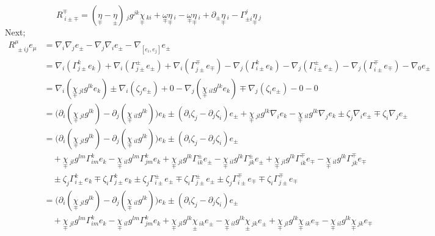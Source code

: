 \documentclass[a4paper,11pt]{article}
\numberwithin{equation}{section}
\theoremstyle{definition}
\begin{document}
\begin{equation}
    \boxed{R^\mp_{\;i\pm\mp} =
    (\underset{\mp}{\eta}-\underset{\pm}{\eta})\,_jg^{jk}\underset{\mp}{\chi}\,_{ki}
    +  \underset{\mp}{\omega} \underset{\mp}{\eta}\,_i
    -\underset{\mp}{\omega}\underset{\mp}{\eta}\,_i
    +\partial_\pm\underset{\mp}{\eta}\,_i  -\Gamma_{\pm i}^j\underset{\mp}{\eta}\,_j}
\end{equation}
Next;
\begin{align*}
    R^\mu_{\;\pm ij} e_\mu &= \nabla_i \nabla_j e_\pm - \nabla_j \nabla_i e_\pm - \nabla_{[e_i,e_j]} e_\pm\\
    &= \nabla_i (\Gamma_{j\pm}^k e_k) + \nabla_i (\Gamma_{j\pm}^\pm e_\pm) + \nabla_i (\Gamma_{j\pm}^\mp e_\mp) - \nabla_j(\Gamma_{i\pm}^k e_k) - \nabla_j(\Gamma_{i\pm}^\pm e_\pm) - \nabla_j(\Gamma_{i\pm}^\mp e_\mp) - \nabla_0 e_\pm\\
    &= \nabla_i (\underset{\mp}{\chi}\,_{jl}g^{lk} e_k) \pm \nabla_i (\zeta_j e_\pm) + 0 - \nabla_j(\underset{\mp}{\chi}\,_{il}g^{lk} e_k) \mp \nabla_j(\zeta_i e_\pm) - 0 - 0\\
    &= \Big(\partial_i (\underset{\mp}{\chi}\,_{jl}g^{lk}) - \partial_j(\underset{\mp}{\chi}\,_{il}g^{lk}) \Big)e_k \pm (\partial_i \zeta_j - \partial_j\zeta_i )e_\pm
    + \underset{\mp}{\chi}\,_{jl} g^{lk} \nabla_i e_k
    - \underset{\mp}{\chi}\,_{il} g^{lk} \nabla_j e_k
    \pm \zeta_j\nabla_i e_\pm
    \mp \zeta_i\nabla_j e_\pm\\
    &= \Big(\partial_i (\underset{\mp}{\chi}\,_{jl}g^{lk}) - \partial_j(\underset{\mp}{\chi}\,_{il}g^{lk}) \Big)e_k \pm (\partial_i \zeta_j - \partial_j\zeta_i )e_\pm\\
    &\quad + \underset{\mp}{\chi}\,_{jl}g^{lm} \Gamma_{im}^k e_k - \underset{\mp}{\chi}\,_{il}g^{lm}\Gamma_{jm}^k e_k + \underset{\mp}{\chi}\,_{jl}g^{lk} \Gamma_{ik}^\pm e_\pm - \underset{\mp}{\chi}\,_{il}g^{lk}\Gamma_{jk}^\pm e_\pm + \underset{\mp}{\chi}\,_{jl}g^{lk} \Gamma_{ik}^\mp e_\mp - \underset{\mp}{\chi}\,_{il}g^{lk}\Gamma_{jk}^\mp e_\mp\\
    &\quad \pm \zeta_j\Gamma_{i\pm}^k e_k
    \mp \zeta_i\Gamma_{j\pm}^k e_k \pm \zeta_j\Gamma_{i\pm}^\pm e_\pm \mp \zeta_i\Gamma_{j\pm}^\pm e_\pm \pm \zeta_j\Gamma_{i\pm}^\mp e_\mp \mp \zeta_i\Gamma_{j\pm}^\mp e_\mp\\
    &= \Big(\partial_i (\underset{\mp}{\chi}\,_{jl}g^{lk}) - \partial_j(\underset{\mp}{\chi}\,_{il}g^{lk}) \Big)e_k \pm (\partial_i \zeta_j - \partial_j\zeta_i )e_\pm\\
    &\quad + \underset{\mp}{\chi}\,_{jl}g^{lm} \Gamma_{im}^k e_k - \underset{\mp}{\chi}\,_{il}g^{lm}\Gamma_{jm}^k e_k + \underset{\mp}{\chi}\,_{jl}g^{lk} \underset{\pm}{\chi}\,_{ik} e_\pm - \underset{\mp}{\chi}\,_{il}g^{lk}\underset{\pm}{\chi}\,_{jk} e_\pm + \underset{\mp}{\chi}\,_{jl}g^{lk} \underset{\mp}{\chi}\,_{ik} e_\mp - \underset{\mp}{\chi}\,_{il}g^{lk}\underset{\mp}{\chi}\,_{jk} e_\mp\\

\end{align*}
\end{document}
